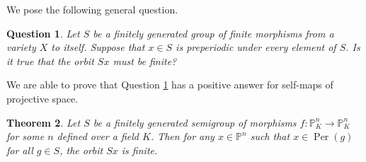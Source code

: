 \documentclass{amsart}
\newcommand{\lra}{\longrightarrow}
\newcommand{\bP}{\mathbb{P}}
\DeclareMathOperator{\Per}{Per}
\newtheorem{thm}{Theorem}[section]
\newtheorem{quest}[thm]{Question}
\theoremstyle{definition}
\begin{document}
We pose the following general question.

\begin{quest}\label{BurnsQ}
Let $S$ be a finitely generated group of finite morphisms from a
variety $X$ to itself.  Suppose that $x \in S$ is preperiodic under
every element of $S$.  Is it true that the orbit $Sx$ must be finite?
 \end{quest} 

We are able to prove that Question \ref{BurnsQ} has a positive answer
for self-maps of projective space.  
 
\begin{thm}\label{polar-burn}
  Let $S$ be a finitely generated semigroup of morphisms
  $f: \bP_K^n \lra \bP_K^n$ for some $n$ defined over a field $K$.
  Then for any $x \in \bP^n$ such that $x \in \Per(g)$ for all
  $g \in S$, the orbit $Sx$ is finite.
\end{thm}
\end{document}

